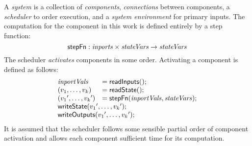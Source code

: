 A \emph{system} is a collection of \emph{components}, \emph{connections} between components, a \emph{scheduler} to order execution, and a \emph{system environment} for primary inputs. The computation for the component in this work is defined entirely by a step function:
\[
\mathsf{stepFn} : \mathit{inports} \times \mathit{stateVars} \to \mathit{stateVars}
\]
The scheduler \emph{activates} components in some order. Activating a component is defined as follows: 
\[
\begin{array}{ll}
 \mathit{inportVals} & = \konst{readInputs}(); \\
 (v_1,\ldots,v_k) & = \konst{readState}() ; \\
 ({v_1}',\ldots,{v_k}') & = \konst{stepFn} (\mathit{inportVals},\mathit{stateVars}) ; \\
 \multicolumn{2}{l}{\konst{writeState}({v_1}',\ldots,{v_k}');} \\
 \multicolumn{2}{l}{\konst{writeOutputs}({v_1}',\ldots,{v_k}');} \\
\end{array}
\]
It is assumed that the scheduler follows some sensible partial order of component activation and allows each component sufficient time for its computation.

